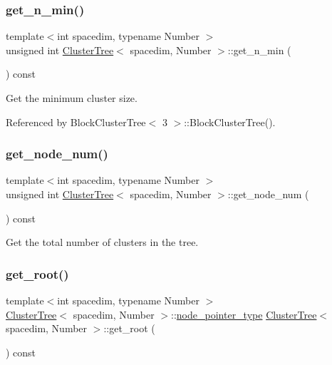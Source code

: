 \subsubsection{\texorpdfstring{get\+\_\+n\+\_\+min()}{get\_n\_min()}}
{\footnotesize\ttfamily template$<$int spacedim, typename Number $>$ \\
unsigned int \hyperlink{classClusterTree}{Cluster\+Tree}$<$ spacedim, Number $>$\+::get\+\_\+n\+\_\+min (\begin{DoxyParamCaption}{ }\end{DoxyParamCaption}) const}

Get the minimum cluster size. 

Referenced by Block\+Cluster\+Tree$<$ 3 $>$\+::\+Block\+Cluster\+Tree().

\mbox{\label{classClusterTree_af80051449b7324121fb0a27d5ce7c9a1}} 
\subsubsection{\texorpdfstring{get\+\_\+node\+\_\+num()}{get\_node\_num()}}
{\footnotesize\ttfamily template$<$int spacedim, typename Number $>$ \\
unsigned int \hyperlink{classClusterTree}{Cluster\+Tree}$<$ spacedim, Number $>$\+::get\+\_\+node\+\_\+num (\begin{DoxyParamCaption}{ }\end{DoxyParamCaption}) const}

Get the total number of clusters in the tree. \mbox{\label{classClusterTree_a13132bfc3ca8b70af8c80066565b0adb}} 
\subsubsection{\texorpdfstring{get\+\_\+root()}{get\_root()}}
{\footnotesize\ttfamily template$<$int spacedim, typename Number $>$ \\
\hyperlink{classClusterTree}{Cluster\+Tree}$<$ spacedim, Number $>$\+::\hyperlink{classClusterTree_ae4bb0fdc7ac559d7844d04a00ab3e9de}{node\+\_\+pointer\+\_\+type} \hyperlink{classClusterTree}{Cluster\+Tree}$<$ spacedim, Number $>$\+::get\+\_\+root (\begin{DoxyParamCaption}{ }\end{DoxyParamCaption}) const}


